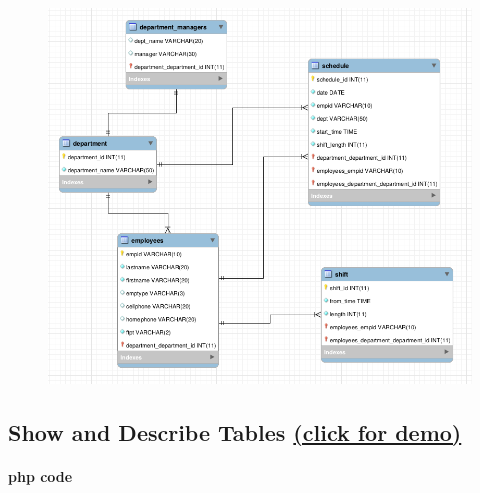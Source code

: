\documentclass[11pt]{article}
\makeatletter
\def\maxwidth{\ifdim\Gin@nat@width>\linewidth\linewidth
    \else\Gin@nat@width\fi}
\let\Oldincludegraphics\includegraphics
\renewcommand{\includegraphics}[1]{\Oldincludegraphics[width=.8\maxwidth]{#1}}
\makeatother
\begin{document}
    \begin{figure}[H]
\centering
\includegraphics{1.png}
\caption{}
\end{figure}

    \subsection*{\texorpdfstring{Show and Describe Tables
\href{http://cs431project-jxy225.herokuapp.com/view/main.php}{(click for
demo)}}{Show and Describe Tables click for demo}}\label{show-and-describe-tables-click-for-demo}

    \paragraph{php code}\label{php-code}
\end{document}

